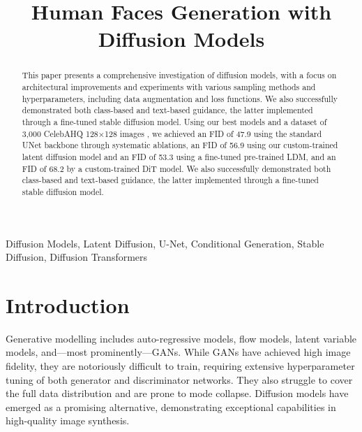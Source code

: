 \documentclass[conference]{IEEEtran}
\begin{document}
\title{Human Faces Generation with Diffusion Models\\

}

\author{
}


\maketitle

\begin{abstract}\label{abstract}
This paper presents a comprehensive investigation of diffusion models, with a focus on architectural improvements and experiments with various sampling methods and hyperparameters, including data augmentation and loss functions. We also successfully demonstrated both class-based and text-based guidance, the latter implemented through a fine-tuned stable diffusion model. Using our best models and a dataset of 3,000 CelebAHQ 128×128 images \cite{karrasProgressiveGrowingGANs2018a}, we achieved an FID of 47.9 using the standard UNet backbone through systematic ablations, an FID of 56.9 using our custom-trained latent diffusion model and an FID of 53.3 using a fine-tuned pre-trained LDM, and an FID of 68.2 by a custom-trained DiT model.
We also successfully demonstrated both class-based and text-based guidance, the latter implemented through a fine-tuned stable diffusion model.

\end{abstract}

\begin{IEEEkeywords}\label{keywords}
Diffusion Models, Latent Diffusion, U-Net, Conditional Generation, Stable Diffusion, Diffusion Transformers
\end{IEEEkeywords}

\section{Introduction} \label{introduction}
Generative modelling includes auto-regressive models, flow models, latent variable models, and—most prominently—GANs\cite{goodfellowGenerativeAdversarialNetworks2014}. While GANs have achieved high image fidelity, they are notoriously difficult to train, requiring extensive hyperparameter tuning of both generator and discriminator networks. They also struggle to cover the full data distribution and are prone to mode collapse. Diffusion models have emerged as a promising alternative, demonstrating exceptional capabilities in high-quality image synthesis. 
\end{document}
